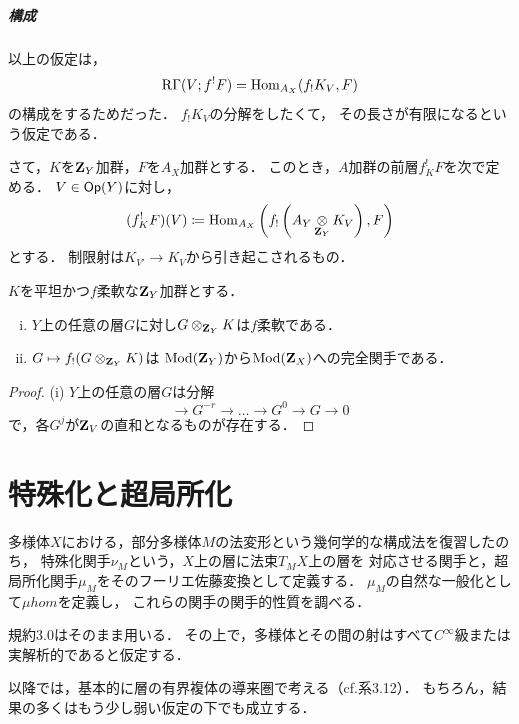 \paragraph{構成}
以上の仮定は，
\[
    \mathop{\mathrm{R}\hspace{-0pt}\Gamma}\nolimits(V;f^!{F})
    =\mathop{\mathrm{Hom}}\nolimits_{A_X}({f_!}K_V,F)
\]
の構成をするためだった．
\(f_!K_V\)の分解をしたくて，
その長さが有限になるという仮定である．

さて，\(K\)を\(\mathbf{Z}_Y\)加群，\(F\)を\(A_X\)加群とする．
このとき，\(A\)加群の前層\(f^!_KF\)を次で定める．
\(V\in\mathop{\textsf{Op}}\nolimits(Y)\)に対し，
\[
    (f^!_KF)(V)
    \coloneqq
    \mathop{\mathrm{Hom}}\nolimits_{A_X}\left(f_!\left(
        A_Y\mathop{\otimes}\limits_{\mathbf{Z}_Y}K_V
    \right),F\right)
\]
とする．
制限射は\(K_{V'}\to{K_V}\)から引き起こされるもの．

\begin{LMM}
    \(K\)を平坦かつ\(f\)柔軟な\(\mathbf{Z}_Y\)加群とする．
    \begin{enumerate}[(i)]
        \item \(Y\)上の任意の層\(G\)に対し\(G\otimes_{\mathbf{Z}_Y}K\)は\(f\)柔軟である．
        \item \(G\mapsto f_!(G\otimes_{\mathbf{Z}_Y}K)\)は
        \(\mathop{\mathrm{Mod}}\nolimits(\mathbf{Z}_Y)\)から\(\mathop{\mathrm{Mod}}\nolimits(\mathbf{Z}_X)\)への完全関手である．
    \end{enumerate}
\end{LMM}
\begin{proof}
    (i) 
    \(Y\)上の任意の層\(G\)は分解
    \[
        \to{G^{-r}}\to\dots\to{G^{0}}\to{G}\to0
    \]
    で，各\(G^{j}\)が\(\mathbf{Z}_V\)の直和となるものが存在する．
\end{proof}




\chapter{特殊化と超局所化}\label{chap4}
多様体\(X\)における，部分多様体\(M\)の法変形という幾何学的な構成法を復習したのち，
特殊化関手\(\nu_M\)という，\(X\)上の層に法束\(T_MX\)上の層を
対応させる関手と，超局所化関手\(\mu_M\)をそのフーリエ佐藤変換として定義する．
\(\mu_M\)の自然な一般化として\(\mu hom\)を定義し，
これらの関手の関手的性質を調べる．

\setcounter{CNV}{-1}
\begin{CNV}\label{cnv40}
    規約3.0はそのまま用いる．
    その上で，多様体とその間の射はすべて\(C^{\infty}\)級または実解析的であると仮定する．

    以降では，基本的に層の有界複体の導来圏で考える（cf.系3.12）．
    もちろん，結果の多くはもう少し弱い仮定の下でも成立する．
\end{CNV}

